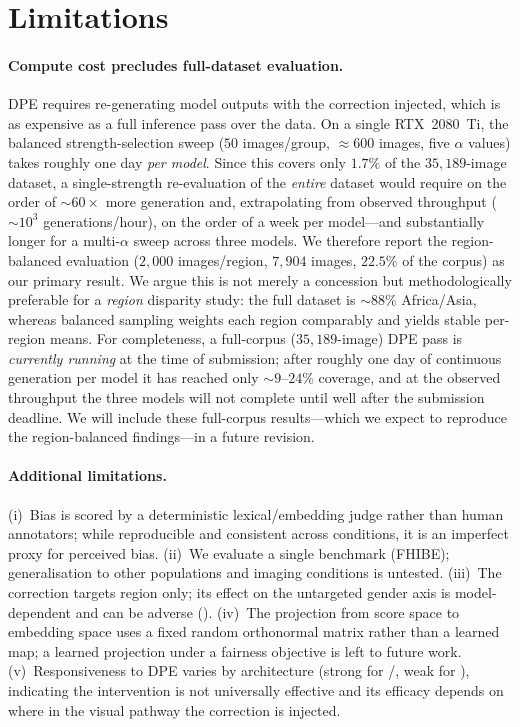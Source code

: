 \section{Limitations}
\label{sec:limitations}

\paragraph{Compute cost precludes full-dataset evaluation.}
DPE requires re-generating model outputs with the correction injected, which is
as expensive as a full inference pass over the data. On a single RTX~2080~Ti,
the balanced strength-selection sweep ($50$ images/group, $\approx600$ images,
five $\alpha$ values) takes roughly one day \emph{per model}. Since this covers
only $1.7\%$ of the $35{,}189$-image dataset, a single-strength re-evaluation of
the \emph{entire} dataset would require on the order of $\sim\!60\times$ more
generation and, extrapolating from observed throughput ($\sim\!10^3$
generations/hour), on the order of a week per model---and substantially longer
for a multi-$\alpha$ sweep across three models. We therefore report the region-balanced
evaluation ($2{,}000$ images/region, $7{,}904$ images, $22.5\%$ of the corpus) as
our primary result. We argue this is not merely a concession but methodologically
preferable for a \emph{region} disparity study: the full dataset is
$\sim\!88\%$ Africa/Asia, whereas balanced sampling weights each region comparably
and yields stable per-region means. For completeness, a full-corpus
($35{,}189$-image) DPE pass is \emph{currently running} at the time of submission;
after roughly one day of continuous generation per model it has reached only
$\sim\!9$--$24\%$ coverage, and at the observed throughput the three models will
not complete until well after the submission deadline. We will include these
full-corpus results---which we expect to reproduce the region-balanced
findings---in a future revision.

\paragraph{Additional limitations.}
(i)~Bias is scored by a deterministic lexical/embedding judge rather than human
annotators; while reproducible and consistent across conditions, it is an
imperfect proxy for perceived bias. (ii)~We evaluate a single benchmark (FHIBE);
generalisation to other populations and imaging conditions is untested.
(iii)~The correction targets region only; its effect on the untargeted gender
axis is model-dependent and can be adverse (). (iv)~The
projection from score space to embedding space uses a fixed random orthonormal
matrix rather than a learned map; a learned projection under a fairness objective
is left to future work. (v)~Responsiveness to DPE varies by architecture
(strong for /, weak for
), indicating the intervention is not universally effective
and its efficacy depends on where in the visual pathway the correction is
injected.
